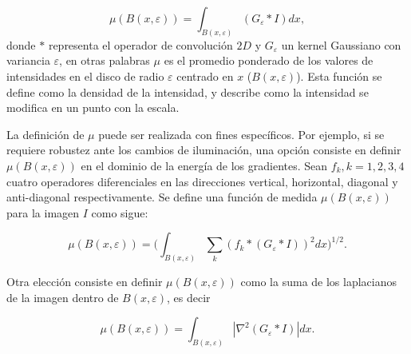 \begin{equation}
\mu(B(x,\varepsilon)) = \int_{B(x,\varepsilon)}{(G_{\varepsilon} \ast I)} dx,
\label{eqn:eqn11}
\end{equation}
\noindent donde $\ast$ representa el operador de convolución $2D$ y $G_{\varepsilon}$ un kernel Gaussiano con variancia $\varepsilon$, en otras palabras $\mu$ es el promedio ponderado de los valores de intensidades en el disco de radio $\varepsilon$ centrado en $x$ ($B(x,\varepsilon)$).
Esta función se define como la densidad de la intensidad, y describe como la intensidad se modifica en un punto con la escala.

La definición de $\mu$ puede ser realizada con fines específicos.
Por ejemplo, si se requiere robustez ante los cambios de iluminación, una opción consiste en definir $\mu(B(x,\varepsilon))$ en el dominio de la energía de los gradientes.
Sean ${ f_{k} , k = 1, 2, 3, 4}$ cuatro operadores diferenciales en las direcciones vertical, horizontal, diagonal y anti-diagonal respectivamente.
Se define una función de medida $\mu(B(x,\varepsilon))$ para la imagen $I$ como sigue:

\begin{equation}
\mu(B(x,\varepsilon)) = (\int_{B(x,\varepsilon)}{\sum_{k}{(f_{k} \ast (G_{\varepsilon} \ast I))^{2}} dx)^{1/2}}.
\label{eqn:gradient}
\end{equation}

Otra elección consiste en definir $\mu(B(x, \varepsilon))$ como la suma de los laplacianos de la imagen dentro de $B(x, \varepsilon)$, es decir

\begin{equation}
\mu(B(x,\varepsilon)) = \int_{B(x,\varepsilon)}|\nabla^2 (G_{\varepsilon} \ast I)| dx.
\label{eqn:laplacian}
\end{equation}

